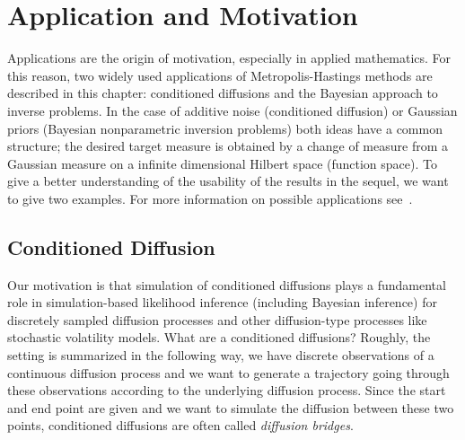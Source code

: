 \chapter{Application and Motivation}
\label{Application}


Applications are the origin of motivation, especially in applied mathematics. For this reason, two widely used applications of Metropolis-Hastings methods are described in this chapter: conditioned diffusions and the Bayesian approach to inverse problems. In the case of additive noise (conditioned diffusion) or Gaussian priors (Bayesian nonparametric inversion problems) both ideas have a common structure; the desired target measure is obtained by a change of measure from a Gaussian measure on a infinite dimensional Hilbert space (function space). To give a better understanding of the usability of the results in the sequel, we want to give two examples. For more information on possible applications see~\autocite{Beskos2009, Beskos2008, Dashti2012, Dashti2013, Delyon2006, Hairer2011, Stuart2010}.

\section{Conditioned Diffusion}

Our motivation is that simulation of conditioned diffusions plays a fundamental role in simulation-based likelihood inference (including Bayesian inference) for discretely sampled diffusion processes and other diffusion-type processes like stochastic volatility models. What are a conditioned diffusions?  Roughly, the setting is summarized in the following way, we have discrete observations of a continuous diffusion process and we want to generate a trajectory going through these observations according to the underlying diffusion process. Since the start and end point are given and we want to simulate the diffusion between these two points, conditioned diffusions are often called \textit{diffusion bridges}.

